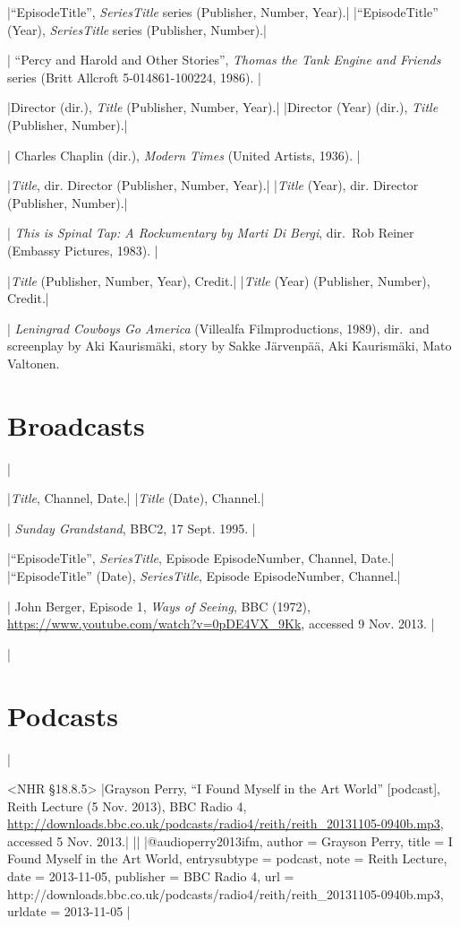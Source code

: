 \documentclass[extrafontsizes,11pt,a4paper,oneside]{memoir}
\newcommand*{\lit}[1]{\textsf{#1}}
\begin{document}
\specs
|\enquote{EpisodeTitle}, \emph{SeriesTitle} \lit{series} (Publisher, Number, Year).|%
|\enquote{EpisodeTitle} (Year), \emph{SeriesTitle} \lit{series} (Publisher, Number).|

\todoc|
\enquote{Percy and Harold and Other Stories}, \emph{Thomas the Tank Engine and Friends} series (Britt Allcroft 5-014861-100224, 1986).
|

\specs
|Director (\lit{dir.}), \emph{Title} (Publisher, Number, Year).|%
|Director (Year) (\lit{dir.}), \emph{Title} (Publisher, Number).|

\todoc|
Charles Chaplin (dir.), \emph{Modern Times} (United Artists, 1936).
|

\specs
|\emph{Title}, \lit{dir.} Director (Publisher, Number, Year).|%
|\emph{Title} (Year), \lit{dir.} Director (Publisher, Number).|

\todoc|
\emph{This is Spinal Tap: A Rockumentary by Marti Di Bergi}, dir.\ Rob Reiner (Embassy Pictures, 1983).
|

\specs
|\emph{Title} (Publisher, Number, Year), Credit.|%
|\emph{Title} (Year) (Publisher, Number), Credit.|

\todoc|
\emph{Leningrad Cowboys Go America} (Villealfa Filmproductions, 1989), dir.\ and screenplay by Aki Kaurismäki, story by Sakke Järvenpää, Aki Kaurismäki, Mato Valtonen.

\section{Broadcasts}
|

\specs
|\emph{Title}, Channel, Date.|%
|\emph{Title} (Date), Channel.|

\todoc|
\emph{Sunday Grandstand}, BBC2, 17 Sept. 1995.
|

\specs
|\enquote{EpisodeTitle}, \emph{SeriesTitle}, \lit{Episode} EpisodeNumber, Channel, Date.|%
|\enquote{EpisodeTitle} (Date), \emph{SeriesTitle}, \lit{Episode} EpisodeNumber, Channel.|

\todoc|
John Berger, Episode 1, \emph{Ways of Seeing}, BBC (1972), \url{https://www.youtube.com/watch?v=0pDE4VX_9Kk}, accessed 9 Nov. 2013.
|

\todoc|
\section{Podcasts}
|

\bibexample<NHR \S18.8.5>
|Grayson Perry, \enquote{I Found Myself in the Art World} [podcast], Reith Lecture (5 Nov. 2013), BBC Radio 4, \url{http://downloads.bbc.co.uk/podcasts/radio4/reith/reith_20131105-0940b.mp3}, accessed 5 Nov. 2013.|%
||%
|@audio{perry2013ifm,
  author = {Grayson Perry},
  title = {I Found Myself in the Art World},
  entrysubtype = {podcast},
  note = {Reith Lecture},
  date = {2013-11-05},
  publisher = {BBC Radio 4},
  url = {http://downloads.bbc.co.uk/podcasts/radio4/reith/reith_20131105-0940b.mp3},
  urldate = {2013-11-05}
}|
\end{document}
